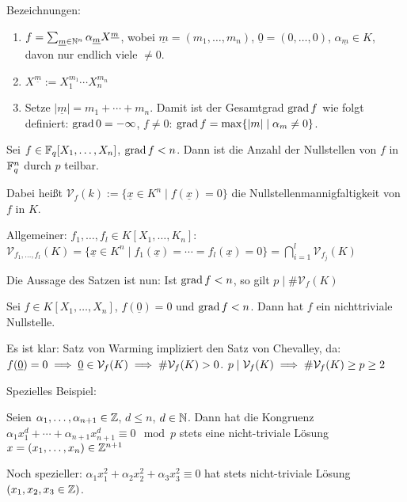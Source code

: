 \documentclass[a4paper,DIV15,BCOR12mm]{article}
\begin{document}
Bezeichnungen:
\begin{enumerate}
\item $f = \sum_{\underline m\in\mathbb{N}^n} \alpha_{\underline m}X ^{\underline m}$, wobei $\underline m = (m_1, \ldots, m_n)$, $\underline 0 = (0,\ldots,0)$, $\alpha_{\underline m} \in K$, davon nur endlich viele $\ne 0$.
\item $X^{\underline m} := X_1^{m_1}\cdots X_n^{m_n}$
\item Setze $|\underline m| = m_1 + \cdots + m_n$. Damit ist der Gesamtgrad $\mathop{\rm grad}\nolimits f$ wie folgt definiert: $\mathop{\rm grad}\nolimits 0 = -\infty$, $f\ne 0$: $\mathop{\rm grad}\nolimits f = \max\{|m| \mid \alpha_{m} \ne 0\}$.
\end{enumerate}

\begin{satz}
Sei $f\in\mathbb{F}_q[X_1,\ldots,X_n]$, $\mathop{\rm grad}\nolimits f < n$. Dann ist die Anzahl der Nullstellen von $f$ in $\mathbb{F}_q^n$ durch $p$ teilbar.

Dabei heißt $\mathcal{V}_f(k) := \{\underline x\in K^n \mid f(\underline x) = 0\}$ die Nullstellenmannigfaltigkeit von $f$ in $K$.

Allgemeiner: $f_1,\ldots,f_l \in K[X_1,\ldots,K_n]$: $\mathcal{V}_{f_1,\ldots,f_l}(K)=\{\underline x \in K^n \mid f_1(\underline x)= \cdots =  f_l(\underline x) = 0\}  = \bigcap_{i=1}^l \mathcal{V}_{f_j}(K)$

Die Aussage des Satzen ist nun: Ist $\mathop{\rm grad}\nolimits f < n$, so gilt $p \mid \#\mathcal{V}_f(K)$
\end{satz}

\begin{satz}
Sei $f\in K[X_1,\ldots,X_n]$, $f(\underline 0) = 0$ und $\mathop{\rm grad}\nolimits f < n$. Dann hat $f$ ein nichttriviale Nullstelle.
\end{satz}

Es ist klar: Satz von Warming impliziert den Satz von Chevalley, da: $f(\underline 0) = 0 \implies \underline 0 \in \mathcal{V}_f(K) \implies \#\mathcal{V}_f(K)>0$. $p\mid \mathcal{V}_f(K) \implies \#\mathcal{V}_f(K) \ge p \ge 2$

Spezielles Beispiel:
\begin{satz}
Seien $\alpha_1,\ldots,\alpha_{n+1} \in \mathbb{Z}$, $d\le n$, $d\in\mathbb{N}$. Dann hat die Kongruenz $\alpha_1 x_1^d + \cdots + \alpha_{n+1}x_{n+1}^d \equiv 0 \mod p$ stets eine nicht-triviale Lösung $x=(x_1,\ldots,x_n)\in\mathbb{Z}^{n+1}$
\end{satz}

Noch spezieller: $\alpha_1x_1^2 + \alpha_2x_2^2 + \alpha_3x_3^2\equiv 0$ hat stets nicht-triviale Lösung $(x_1,x_2,x_3 \in \mathbb{Z})$.
\end{document}
